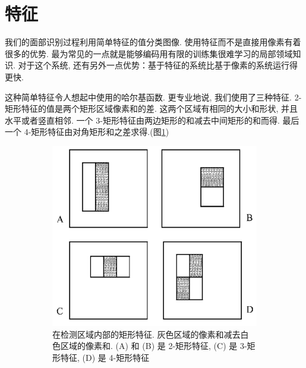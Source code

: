 \documentclass[a4paper,utf8,11pt]{ctexart}
\renewcommand{\captionlabelfont}{\kaishu\zihao{5}}
\begin{document}
\section{特征}\label{sec:feature}
我们的面部识别过程利用简单特征的值分类图像. 使用特征而不是直接用像素有着很多的优势. 最为常见的一点就是能够编码用有限的训练集很难学习的局部领域知识. 对于这个系统, 还有另外一点优势：基于特征的系统比基于像素的系统运行得更快. 

这种简单特征令人想起\citet{papageorgiou1998general}中使用的哈尔基函数. 更专业地说, 我们使用了三种特征. 2-矩形特征的值是两个矩形区域像素和的差. 这两个区域有相同的大小和形状, 并且水平或者竖直相邻.
一个 3-矩形特征由两边矩形的和减去中间矩形的和而得. 最后一个 4-矩形特征由对角矩形和之差求得.(图\ref{fig:rectangle})
\begin{figure}[!htb]
\centering
\begin{subfigure}{0.3\textwidth}
\includegraphics[width=\textwidth]{rectangle.png}
\renewcommand{\captionlabelfont}{\kaishu\zihao{6}}
\caption{ 在检测区域内部的矩形特征. 灰色区域的像素和减去白色区域的像素和. (A) 和 (B) 是 2-矩形特征, (C) 是 3-矩形特征, (D) 是 4-矩形特征}
\label{fig:rectangle}
\end{subfigure}
\quad\quad\quad\quad
\begin{subfigure}{0.3\textwidth}

\end{subfigure}
\end{figure}
\end{document}
